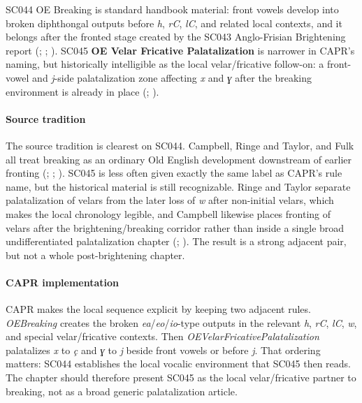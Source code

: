 \documentclass[
  british,
  a4paper,
]{article}
\begin{document}
SC044 OE Breaking is standard handbook material: front vowels develop
into broken diphthongal outputs before \emph{h}, \emph{rC}, \emph{lC},
and related local contexts, and it belongs after the fronted stage
created by the SC043 Anglo-Frisian Brightening report
(;
; ). SC045
\textbf{OE Velar Fricative Palatalization} is narrower in CAPR's naming,
but historically intelligible as the local velar/fricative follow-on: a
front-vowel and \emph{j}-side palatalization zone affecting \emph{x} and
\emph{ɣ} after the breaking environment is already in place
(;
).

\paragraph{Source tradition}\label{source-tradition-28}

The source tradition is clearest on SC044. Campbell, Ringe and Taylor,
and Fulk all treat breaking as an ordinary Old English development
downstream of earlier fronting (; ; ).
SC045 is less often given exactly the same label as CAPR's rule name,
but the historical material is still recognizable. Ringe and Taylor
separate palatalization of velars from the later loss of \emph{w} after
non-initial velars, which makes the local chronology legible, and
Campbell likewise places fronting of velars after the
brightening/breaking corridor rather than inside a single broad
undifferentiated palatalization chapter
(;
). The result is a strong adjacent pair, but not a whole
post-brightening chapter.

\paragraph{CAPR implementation}\label{capr-implementation-28}

CAPR makes the local sequence explicit by keeping two adjacent rules.
\emph{OEBreaking} creates the broken \emph{ea}/\emph{eo}/\emph{io}-type
outputs in the relevant \emph{h}, \emph{rC}, \emph{lC}, \emph{w}, and
special velar/fricative contexts. Then
\emph{OEVelarFricativePalatalization} palatalizes \emph{x} to \emph{ç}
and \emph{ɣ} to \emph{j} beside front vowels or before \emph{j}. That
ordering matters: SC044 establishes the local vocalic environment that
SC045 then reads. The chapter should therefore present SC045 as the
local velar/fricative partner to breaking, not as a broad generic
palatalization article.
\end{document}
